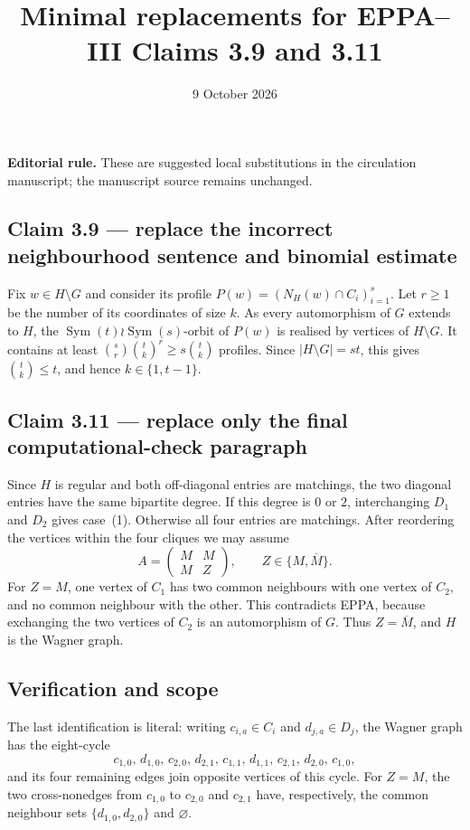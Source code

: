 \documentclass[11pt]{article}
\title{Minimal replacements for EPPA--III Claims 3.9 and 3.11}
\date{9 October 2026}
\begin{document}
\maketitle

\noindent
\textbf{Editorial rule.} These are suggested local substitutions in the
circulation manuscript; the manuscript source remains unchanged.

\subsection*{Claim 3.9 --- replace the incorrect neighbourhood sentence and binomial estimate}

Fix \(w\in H\setminus G\) and consider its profile
\(P(w)=(N_H(w)\cap C_i)_{i=1}^s\).
Let \(r\geq 1\) be the number of its coordinates of size \(k\).
As every automorphism of \(G\) extends to \(H\), the
\(\operatorname{Sym}(t)\wr\operatorname{Sym}(s)\)-orbit of \(P(w)\)
is realised by vertices of \(H\setminus G\). It contains at least
\(\binom sr\binom tk^r\geq s\binom tk\) profiles.
Since \(|H\setminus G|=st\), this gives \(\binom tk\leq t\),
and hence \(k\in\{1,t-1\}\).

\subsection*{Claim 3.11 --- replace only the final computational-check paragraph}

Since \(H\) is regular and both off-diagonal entries are matchings,
the two diagonal entries have the same bipartite degree.
If this degree is \(0\) or \(2\), interchanging \(D_1\) and \(D_2\)
gives case~(1). Otherwise all four entries are matchings.
After reordering the vertices within the four cliques we may assume
\[
 A=\begin{pmatrix}M&M\\ M&Z\end{pmatrix},
 \qquad Z\in\{M,\overline M\}.
\]
For \(Z=M\), one vertex of \(C_1\) has two common neighbours
with one vertex of \(C_2\), and no common neighbour with
the other. This contradicts EPPA, because exchanging the two
vertices of \(C_2\) is an automorphism of \(G\).
Thus \(Z=\overline M\), and \(H\) is the Wagner graph.

\subsection*{Verification and scope}

The last identification is literal: writing \(c_{i,a}\in C_i\) and
\(d_{j,a}\in D_j\), the Wagner graph has the eight-cycle
\[
 c_{1,0},\,d_{1,0},\,c_{2,0},\,d_{2,1},\,
 c_{1,1},\,d_{1,1},\,c_{2,1},\,d_{2,0},\,c_{1,0},
\]
and its four remaining edges join opposite vertices of this
cycle. For \(Z=M\), the two cross-nonedges from \(c_{1,0}\) to
\(c_{2,0}\) and \(c_{2,1}\) have, respectively, the common
neighbour sets \(\{d_{1,0},d_{2,0}\}\) and \(\varnothing\).
\end{document}
